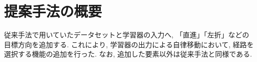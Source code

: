 
\section{提案手法の概要}
従来手法で用いていたデータセットと学習器の入力へ, 「直進」「左折」などの目標方向を追加する. これにより, 学習器の出力による自律移動において, 経路を選択する機能の追加を行った. なお, 追加した要素以外は従来手法と同様である.



\newpage
